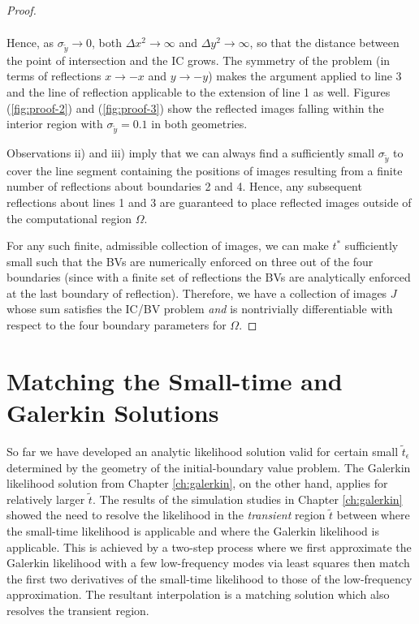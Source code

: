 \begin{proof}
\begin{enumerate}
\begin{align*}
    \end{align*}
    Hence, as $\sigma_{\tilde{y}} \to 0$, both $\Delta x^2 \to \infty$ and
    $\Delta y^2 \to \infty$, so that the distance between the point of
    intersection and the IC grows. The symmetry of the problem (in
    terms of reflections $x \to -x$ and $y \to -y$) makes the argument
    applied to line 3 and the line of reflection applicable to the
    extension of line 1 as well. Figures (\ref{fig:proof-2}) and
    (\ref{fig:proof-3}) show the reflected images falling within the
    interior region with $\sigma_{\tilde{y}} = 0.1$ in both geometries.
  \end{enumerate}
  Observations ii) and iii) imply that we can always find a
  sufficiently small $\sigma_{\tilde{y}}$ to cover the line segment
  containing the positions of images resulting from a finite number of
  reflections about boundaries 2 and 4.  Hence, any subsequent
  reflections about lines 1 and 3 are guaranteed to place reflected
  images outside of the computational region $\Omega$.

  For any such finite, admissible collection of images, we can make
  $t^*$ sufficiently small such that the BVs are numerically
  enforced on three out of the four boundaries (since with a finite
  set of reflections the BVs are analytically enforced at the last
  boundary of reflection). Therefore, we have a collection of images
  $J$ whose sum satisfies the IC/BV problem \textit{and} is
  nontrivially differentiable with respect to the four boundary
  parameters for $\Omega$.
\end{proof}

\section{Matching the Small-time and Galerkin Solutions}
So far we have developed an analytic likelihood solution valid for
certain small $\tilde{t}_\epsilon$ determined by the geometry of the
initial-boundary value problem. The Galerkin likelihood solution from
Chapter \ref{ch:galerkin}, on the other hand, applies for relatively
larger $\tilde{t}$.  The results of the simulation studies in Chapter
\ref{ch:galerkin} showed the need to resolve the likelihood in the
\textit{transient} region $\tilde{t}$ between where the small-time
likelihood is applicable and where the Galerkin likelihood is
applicable. This is achieved by a two-step process where we first
approximate the Galerkin likelihood with a few low-frequency modes via
least squares then match the first two derivatives of the small-time
likelihood to those of the low-frequency approximation. The resultant
interpolation is a matching solution which also resolves the transient
region.

